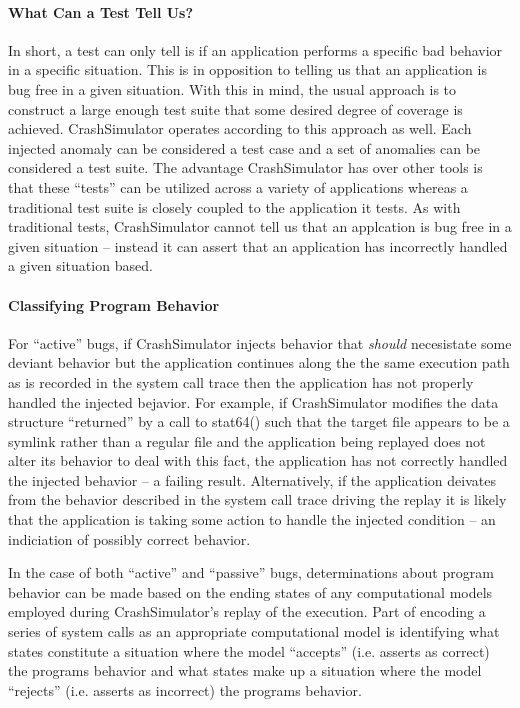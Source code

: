     \paragraph{What Can a Test Tell Us?}

    In short, a test can only tell is if an application performs a specific bad behavior in a specific situation.  This
    is in opposition to telling us that an application is bug free in a given situation.  With this in mind, the usual
    approach is to construct a large enough test suite that some desired degree of coverage is achieved.  CrashSimulator
    operates according to this approach as well.  Each injected anomaly can be considered a test case and a set of
    anomalies can be considered a test suite.  The advantage CrashSimulator has over other tools is that these ``tests''
    can be utilized across a variety of applications whereas a traditional test suite is closely coupled to the
    application it tests.  As with traditional tests, CrashSimulator cannot tell us that an applcation is bug free in a
    given situation -- instead it can assert that an application has incorrectly handled a given situation based.

    \paragraph{Classifying Program Behavior}

    For ``active'' bugs, if CrashSimulator injects behavior that \emph{should} necesistate some deviant behavior but the
    application continues along the the same execution path as is recorded in the system call trace then the application
    has not properly handled the injected bejavior.  For example, if CrashSimulator modifies the data structure
    ``returned'' by a call to stat64() such that the target file appears to be a symlink rather than a regular file and
    the application being replayed does not alter its behavior to deal with this fact, the application has not correctly
    handled the injected behavior -- a failing result.  Alternatively, if the application deivates from the behavior
    described in the system call trace driving the replay it is likely that the application is taking some action to
    handle the injected condition -- an indiciation of possibly correct behavior.

    In the case of both ``active'' and ``passive'' bugs, determinations about program behavior can be made based on the
    ending states of any computational models employed during CrashSimulator's replay of the execution.  Part of
    encoding a series of system calls as an appropriate computational model is identifying what states constitute a
    situation where the model ``accepts'' (i.e. asserts as correct) the programs behavior and what states make up a
    situation where the model ``rejects'' (i.e. asserts as incorrect) the programs behavior.

